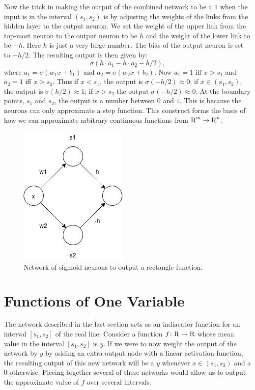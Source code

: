 Now the trick in making the output of the combined network to be a $1$ when the
input is in the interval $(s_1, s_2)$ is by adjusting the weights of the links
from the hidden layer to the output neuron. We set the weight of the upper link
from the top-most neuron to the output neuron to be $h$ and the weight of the
lower link to be $-h$. Here $h$ is just a very large number. The bias of the
output neuron is set to $-h/2$. The resulting output is then given by:
\[
    \sigma (h \cdot a_1 - h \cdot a_2 - h/2),
\]
where $a_1 = \sigma(w_1 x + b_1)$ and $a_2 = \sigma(w_2 x + b_2)$.
Now $a_1 = 1$ iff $x > s_1$ and $a_2 = 1$ iff $x > s_2$. Thus if $x < s_1$, 
the output is $\sigma(-h/2) \approx 0$; if $x \in (s_1, s_2)$, 
the output is $\sigma(h/2) \approx 1$; 
if $x > s_2$ the output $\sigma(-h/2) \approx 0$. 
At the boundary points, $s_1$ and $s_2$, 
the output is a number between $0$ and $1$. This is because the neurons 
can only approximate a step function. This construct forms the basis 
of how we can approximate arbitrary continuous functions from $\text{R}^m \to \text{R}^n$. 
\begin{figure}[ht]
\begin{center}
\includegraphics[scale=0.5]{RectFunction.jpg}
\end{center}
\caption{Network of sigmoid neurons to output a rectangle function.}
\label{fig:nn_rect_func}
\end{figure}

\section{Functions of One Variable}

The network described in the last section acts as an indiacator function
for an interval $[s_1, s_2]$ of the real line. Consider a function 
$f \colon \text{R} \to \text{R}$ whose mean value in the interval $[s_1, s_2]$ 
is $y$. If we were to now weight the output of the network by $y$ by 
adding an extra output node with a linear activation function, the resulting 
output of this new network will be a $y$ whenever $x \in (s_1, s_2)$ and a $0$ 
otherwise. Piecing together several of these networks would allow us 
to output the approximate value of $f$ over several intervals. 


